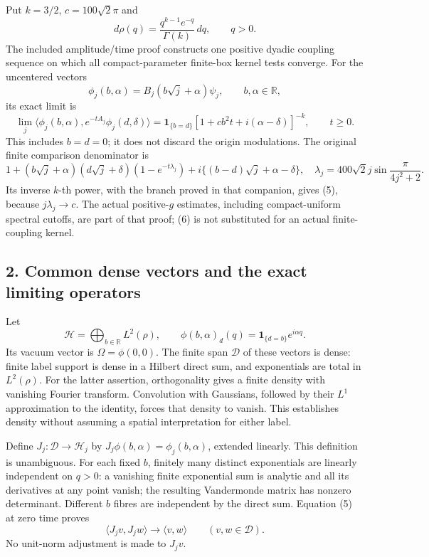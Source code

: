 \documentclass[
  11pt,
]{article}
\begin{document}
Put \(k=3/2\), \(c=100\sqrt2\pi\) and \[
 d\rho(q)=\frac{q^{k-1}e^{-q}}{\Gamma(k)}\,dq,\qquad q>0.
 \tag{3}
\] The included amplitude/time proof constructs one positive dyadic
coupling sequence on which all compact-parameter finite-box kernel tests
converge. For the uncentered vectors \[
 \phi_j(b,\alpha)=B_j(b\sqrt j+\alpha)\psi_j,
 \qquad b,\alpha\in\mathbb R,
 \tag{4}
\] its exact limit is \[
 \lim_j\langle\phi_j(b,\alpha),e^{-tA_j}\phi_j(d,\delta)\rangle
 =\mathbf1_{\{b=d\}}
  [1+cb^2t+i(\alpha-\delta)]^{-k},\qquad t\ge0 .
 \tag{5}
\] This includes \(b=d=0\); it does not discard the origin modulations.
The original finite comparison denominator is \[
 1+(b\sqrt j+\alpha)(d\sqrt j+\delta)
       (1-e^{-t\lambda_j})
       +i\{(b-d)\sqrt j+\alpha-\delta\},
 \quad
 \lambda_j=400\sqrt2j\sin\frac{\pi}{4j^2+2}.
 \tag{6}
\] Its inverse \(k\)-th power, with the branch proved in that companion,
gives (5), because \(j\lambda_j\to c\). The actual positive-\(g\)
estimates, including compact-uniform spectral cutoffs, are part of that
proof; (6) is not substituted for an actual finite-coupling kernel.

\subsection{2. Common dense vectors and the exact limiting
operators}\label{weak-coupling-part-7-common-dense-vectors-and-the-exact-limiting-operators}

Let \[
 \mathcal H=\bigoplus_{b\in\mathbb R}L^2(\rho),\qquad
 \phi(b,\alpha)_d(q)=\mathbf1_{\{d=b\}}e^{i\alpha q}.
 \tag{7}
\] Its vacuum vector is \(\Omega=\phi(0,0)\). The finite span
\(\mathcal D\) of these vectors is dense: finite label support is dense
in a Hilbert direct sum, and exponentials are total in \(L^2(\rho)\).
For the latter assertion, orthogonality gives a finite density with
vanishing Fourier transform. Convolution with Gaussians, followed by
their \(L^1\) approximation to the identity, forces that density to
vanish. This establishes density without assuming a spatial
interpretation for either label.

Define \(J_j:\mathcal D\to\mathcal H_j\) by
\(J_j\phi(b,\alpha)=\phi_j(b,\alpha)\), extended linearly. This
definition is unambiguous. For each fixed \(b\), finitely many distinct
exponentials are linearly independent on \(q>0\): a vanishing finite
exponential sum is analytic and all its derivatives at any point vanish;
the resulting Vandermonde matrix has nonzero determinant. Different
\(b\) fibres are independent by the direct sum. Equation (5) at zero
time proves \[
 \langle J_jv,J_jw\rangle\longrightarrow\langle v,w\rangle
 \qquad(v,w\in\mathcal D).
 \tag{8}
\] No unit-norm adjustment is made to \(J_jv\).
\end{document}
